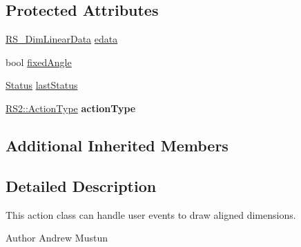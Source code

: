 \subsection*{Protected Attributes}
\begin{DoxyCompactItemize}
\item 
\hyperlink{classRS__DimLinearData}{R\-S\-\_\-\-Dim\-Linear\-Data} \hyperlink{classRS__ActionDimLinear_aa4f47d77d19f888e92b7a5d236a00e72}{edata}
\item 
bool \hyperlink{classRS__ActionDimLinear_aefb615e1a23d3fde4d44ce9b7232d2e5}{fixed\-Angle}
\item 
\hyperlink{classRS__ActionDimLinear_abeef5d00bc33a2b97d5aaf6290c84949}{Status} \hyperlink{classRS__ActionDimLinear_ad0b972a529601f4ab3a0f5fa6a4729dc}{last\-Status}
\item 
\hypertarget{classRS__ActionDimLinear_a0f0b6766f4ac6dbb08ad1f117141ccfa}{\hyperlink{classRS2_afe3523e0bc41fd637b892321cfc4b9d7}{R\-S2\-::\-Action\-Type} {\bfseries action\-Type}}\label{classRS__ActionDimLinear_a0f0b6766f4ac6dbb08ad1f117141ccfa}

\end{DoxyCompactItemize}
\subsection*{Additional Inherited Members}


\subsection{Detailed Description}
This action class can handle user events to draw aligned dimensions.

\begin{DoxyAuthor}{Author}
Andrew Mustun 
\end{DoxyAuthor}


